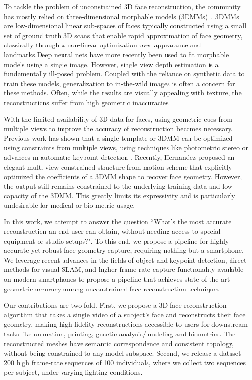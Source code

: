 \documentclass[10pt,twocolumn,letterpaper]{article}
\begin{document}
To tackle the problem of unconstrained 3D face reconstruction, the community has mostly relied on three-dimensional morphable models (3DMMs)~\cite{blanz1999morphable}. 3DMMs are low-dimensional linear sub-spaces of faces typically constructed using a small set of ground truth 3D scans that enable rapid approximation of face geometry, classically through a non-linear optimization over appearance and landmarks.Deep neural nets have more recently been used to fit morphable models using a single image. However, single view depth estimation is a fundamentally ill-posed problem. Coupled with the reliance on synthetic data to train these models, generalization to in-the-wild images is often a concern for these methods. Often, while the results are visually appealing with texture, the reconstructions suffer from high geometric inaccuracies.

With the limited availability of 3D data for faces, using geometric cues from multiple views to improve the accuracy of reconstruction becomes necessary. Previous work has shown that a single template or 3DMM can be optimized using constraints from multiple views, using techniques like photometric stereo \cite{roth2015unconstrained} or advances in automatic keypoint detection \cite{huber2016multiresolution}.
Recently, Hernandez \etal \cite{hernandez2017accurate} proposed an elegant multi-view constrained structure-from-motion scheme that explicitly optimized the coefficients of a 3DMM shape to recover face geometry. However, the output still remains constrained to the underlying training data and low capacity of the 3DMM. This greatly limits its expressivity and is particularly undesirable for medical or bio-metric usage. 


In this work, we attempt to answer the question ``What's the most accurate reconstruction an end-user can obtain, without needing access to special equipment or studio setups?". To this end, we propose a pipeline for highly accurate yet robust face geometry capture, requiring nothing but a smartphone. We leverage recent advances in the fields of object and keypoint detection, direct methods for visual SLAM, and higher frame-rate capture functionality available on modern smartphones to propose a pipeline that achieves state-of-the-art geometric accuracy among unconstrained face reconstruction techniques.

Our contributions are two-fold. First, we propose a 3D face reconstruction algorithm that takes a single video of a subject's face and reconstructs their face geometry, making high fidelity reconstructions accessible to users for downstream tasks like animation, printing, genetic analysis/modeling and biometrics. The reconstructed meshes have semantic correspondence and consistent topology, without being constrained to any model subspace.  Second, we release a dataset 200 high frame-rate sequences of 100 individuals, where we collect two sequences per subject, under varying lighting conditions. 
\end{document}

